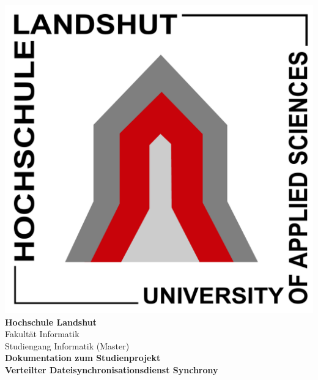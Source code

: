 \documentclass[12pt,oneside,a4paper,bibtotoc,liststotoc,pointlessnumbers]{scrartcl}
\begin{document}
\begin{center}
\includegraphics[scale=0.16]{hs.pdf}\\
\vspace*{10pt}
\textsf{\textbf{\large{Hochschule Landshut}}}\\
\textsf{\normalsize{Fakultät Informatik \\ Studiengang Informatik (Master)}}\\
\vspace*{70pt}
\textsf{\textbf{\Huge{Dokumentation zum Studienprojekt}}} \\
\vspace*{20pt}
\textsf{\textbf{\large{Verteilter Dateisynchronisationsdienst \vspace*{20pt} Synchrony}}}\\
\end{center}
\vspace*{180pt}
\end{document}
